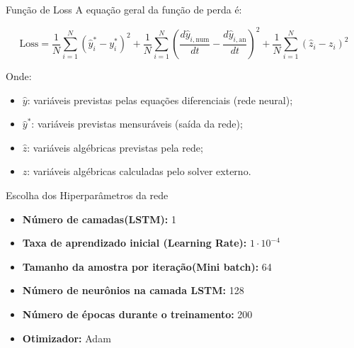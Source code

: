 \begin{frame}{Função de Loss}
    \vspace{0.3cm}
    A equação geral da função de perda é:
    
    \[
    \text{Loss} = \frac{1}{N} \sum_{i=1}^{N} (\hat{y}_i^* - y_i^*)^2
    + \frac{1}{N} \sum_{i=1}^{N} \left( \frac{d\hat{y}_{i,\text{num}}}{dt} - \frac{d\hat{y}_{i,\text{an}}}{dt} \right)^2
    + \frac{1}{N} \sum_{i=1}^{N} (\hat{z}_i - z_i)^2
    \]

    \vspace{0.2cm}
    Onde:
        \begin{itemize}
        \item \( \hat{y} \): variáveis previstas pelas equações diferenciais (rede neural);
        \item \( \hat{y}^* \): variáveis previstas mensuráveis (saída da rede);
        \item \( \hat{z} \): variáveis algébricas previstas pela rede;
        \item \( z \): variáveis algébricas calculadas pelo solver externo.
     \end{itemize}
\end{frame}
\begin{frame}{Escolha dos Hiperparâmetros da rede}
    \vspace{0.3cm}
    \begin{itemize}
        \item \textbf{Número de camadas(LSTM):} 1
        \item \textbf{Taxa de aprendizado inicial (Learning Rate):} $1\cdot10^{-4}$
        \item \textbf{Tamanho da amostra por iteração(Mini batch):} 64
        \item \textbf{Número de neurônios na camada LSTM:} 128
        \item \textbf{Número de épocas durante o treinamento:} 200
        \item \textbf{Otimizador:} Adam
    \end{itemize}
\end{frame}